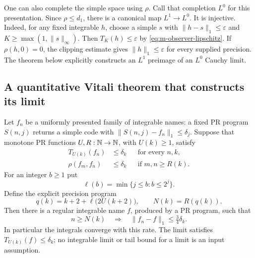 One can also complete the simple space using $\rho$.  Call that completion
$L^0$ for this presentation.  Since $\rho\le d_1$, there is a canonical
map $L^1\to L^0$.  It is injective.  Indeed, for any fixed integrable $h$,
choose a simple $s$ with $\|h-s\|_1\le\varepsilon$ and
$K\ge\max(1,\|s\|_\infty)$.  Then $T_K(h)\le\varepsilon$ by
\eqref{eq:m-observer-lipschitz}.  If $\rho(h,0)=0$, the clipping estimate
gives $\|h\|_1\le\varepsilon$ for every supplied precision.  The theorem
below explicitly constructs an $L^1$ preimage of an $L^0$ Cauchy limit.

\subsection{A quantitative Vitali theorem that constructs its limit}

\begin{theorem}
\label{thm:m-vitali}
Let $f_n$ be a uniformly presented family of integrable names: a fixed PR
program $S(n,j)$ returns a simple code with
$\|S(n,j)-f_n\|_1\le\delta_j$.  Suppose that monotone PR functions
$U,R:\mathbb N\to\mathbb N$, with $U(k)\ge1$, satisfy
\begin{align}
 T_{U(k)}(f_n)&\le\delta_k &&\text{for every }n,k,
 \label{eq:m-ui}\\
 \rho(f_m,f_n)&\le\delta_k &&\text{if }m,n\ge R(k).
 \label{eq:m-rho-cauchy}
\end{align}
For an integer $b\ge1$ put
\[
 \ell(b)=\min\{j\le b: b\le2^j\}.
\]
Define the explicit precision program
\begin{equation}
 q(k)=k+2+\ell\bigl(2U(k+2)\bigr),\qquad
 N(k)=R(q(k)).
 \label{eq:m-vitali-rate}
\end{equation}
Then there is a regular integrable name $f$, produced by a PR program,
such that
\begin{equation}
 n\ge N(k)\quad\Longrightarrow\quad
 \|f_n-f\|_1\le\tfrac34\delta_k.
 \label{eq:m-vitali-convergence}
\end{equation}
In particular the integrals converge with this rate.  The limit satisfies
$T_{U(k)}(f)\le\delta_k$; no integrable limit or tail bound for a limit is
an input assumption.
\end{theorem}

